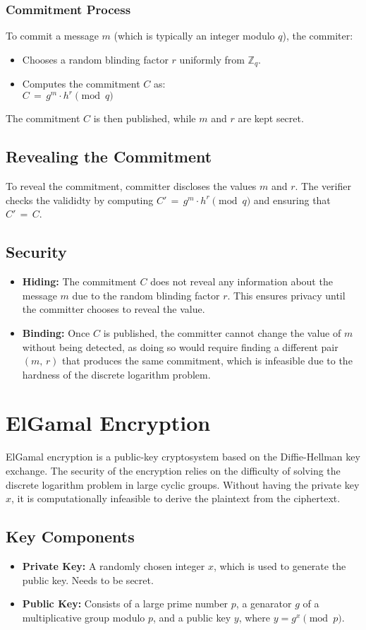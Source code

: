 \documentclass[12pt,a4paper]{report}
\begin{document}
\subsubsection{Commitment Process}
To commit a message $m$ (which is typically an integer modulo $q$), the commiter:
\begin{itemize}
	\item Chooses a random blinding factor $r$ uniformly from $\mathbb{Z}_q$.
	\item Computes the commitment $C$ as:\\ $C\,=\,g^m \cdot h^r \pmod q$
\end{itemize}
The commitment $C$ is then published, while $m$ and $r$ are kept secret.
\subsection*{Revealing the Commitment}
To reveal the commitment, committer discloses the values $m$ and $r$. 
The verifier checks the valididty by computing $C'\,=\,g^m \cdot h^r \pmod q$ and ensuring that $C'\,=\,C$.
\subsection*{Security}
\begin{itemize}
	\item \textbf{Hiding:} The commitment $C$ does not reveal any information about the message $m$ due to the random blinding factor $r$. This ensures privacy until the committer chooses to reveal the value.
	\item \textbf{Binding:} Once $C$ is published, the committer cannot change the value of $m$ without being detected, as doing so would require finding a different pair $(m,\,r)$ that produces the same commitment, which is infeasible due to the hardness of the discrete logarithm problem.
\end{itemize}
\section{ElGamal Encryption}
ElGamal encryption is a public-key cryptosystem based on the Diffie-Hellman key exchange\cite{elgamal}. The security of the encryption relies on the difficulty of solving the discrete logarithm problem in large cyclic groups. Without having the private key $x$, it is computationally infeasible to derive the plaintext from the ciphertext.
\subsection*{Key Components}
\begin{itemize}
	\item \textbf{Private Key:} A randomly chosen integer $x$, which is used to generate the public key. Needs to be secret.
	\item \textbf{Public Key:} Consists of a large prime number $p$, a genarator $g$ of a multiplicative group modulo $p$, and a public key $y$, where $y = g^x \pmod p$.
\end{itemize}
\end{document}
